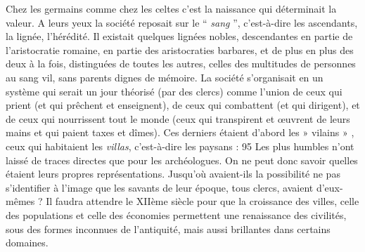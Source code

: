  Chez les germains comme chez les celtes c'est la naissance qui déterminait la valeur. A leurs yeux la société reposait sur le “ \emph{sang} ”, c'est-à-dire les ascendants, la lignée, l'hérédité. Il existait quelques lignées nobles, descendantes en partie de l'aristocratie romaine, en partie des aristocraties barbares, et de plus en plus des deux à la fois, distinguées de toutes les autres, celles des multitudes de personnes au sang vil, sans parents dignes de mémoire. La société s'organisait en un système qui serait un jour théorisé (par des clercs) comme l'union de ceux qui prient (et qui prêchent et enseignent), de ceux qui combattent (et qui dirigent), et de ceux qui nourrissent tout le monde (ceux qui transpirent et œuvrent de leurs mains et qui paient taxes et dîmes). Ces derniers étaient d'abord les » vilains » , ceux qui habitaient les \emph{villas}, c'est-à-dire les paysans : 95%
 Les plus humbles n'ont laissé de traces directes que pour les archéologues. On ne peut donc savoir quelles étaient leurs propres représentations. Jusqu'où avaient-ils la possibilité ne pas s'identifier à l'image que les savants de leur époque, tous clercs, avaient d'eux-mêmes ?
 Il faudra attendre le XIIème siècle pour que la croissance des villes, celle des populations et celle des économies permettent une renaissance des civilités, sous des formes inconnues de l'antiquité, mais aussi brillantes dans certains domaines. 
 
